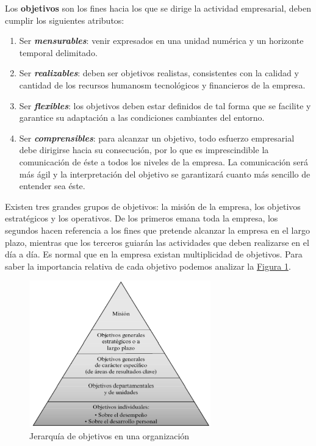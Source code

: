 \documentclass[12pt,a4paper,spanish]{report}
\begin{document}
		Los \textbf{objetivos} son los fines hacia los que se dirige la actividad empresarial, deben cumplir los siguientes atributos:
		\begin{enumerate}[1.  ]
			\item Ser \textcolor[rgb]{0.3,0.6,0.4}{\textbf{\emph{mensurables}}}: venir expresados en una unidad numérica y un horizonte temporal delimitado.

			\item Ser \textcolor[rgb]{0.3,0.6,0.4}{\textbf{\emph{realizables}}}: deben ser objetivos realistas, consistentes con la calidad y cantidad de los recursos humanosm tecnológicos y financieros de la empresa.

			\item Ser \textcolor[rgb]{0.3,0.6,0.4}{\textbf{\emph{flexibles}}}: los objetivos deben estar definidos de tal forma que se facilite y garantice su adaptación a las condiciones cambiantes del entorno.

			\item Ser \textcolor[rgb]{0.3,0.6,0.4}{\textbf{\emph{comprensibles}}}: para alcanzar un objetivo, todo esfuerzo empresarial debe dirigirse hacia su consecución, por lo que es imprescindible la comunicación de éste a todos los niveles de la empresa. La comunicación será más ágil y la interpretación del objetivo se garantizará cuanto más sencillo de entender sea éste.
		\end{enumerate}

		Existen tres grandes grupos de objetivos: la misión de la empresa, los objetivos estratégicos y los operativos. De los primeros emana toda la empresa, los segundos hacen referencia a los fines que pretende alcanzar la empresa en el largo plazo, mientras que los terceros guiarán las actividades que deben realizarse en el día a día. Es normal que en la empresa existan multiplicidad de objetivos. Para saber la importancia relativa de cada objetivo podemos analizar la \hyperref[jerarquia_objetivos]{Figura \ref*{jerarquia_objetivos}}.

		\begin{figure}
			 	\centering
			 		\includegraphics[width=0.7\textwidth]{6}
			 	\caption{Jerarquía de objetivos en una organización}
			 	\label{jerarquia_objetivos}
		\end{figure}
		
\end{document}
